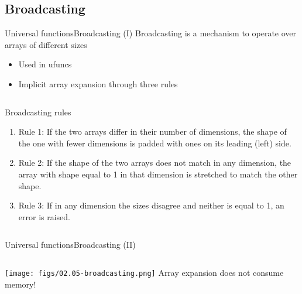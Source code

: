 \documentclass[10pt,compress]{beamer} %
\begin{document}
\subsection{Broadcasting}
\begin{frame}[fragile]{Universal functions}{Broadcasting (I)}
	Broadcasting is a mechanism to operate over arrays of different sizes
	\begin{itemize}
		\item Used in ufuncs
		\item Implicit array expansion through three rules
	\end{itemize}
	\vspace{-0.2cm} 
	\begin{columns}
		\begin{block}{\footnotesize{Broadcasting rules}}
		\vspace{-0.2cm} 
		\begin{enumerate}
		\item Rule 1: If the two arrays differ in their number of dimensions, the shape of the one with fewer dimensions is padded with ones on its leading (left) side.
		\item Rule 2: If the shape of the two arrays does not match in any dimension, the array with shape equal to 1 in that dimension is stretched to match the other shape.
		\item Rule 3: If in any dimension the sizes disagree and neither is equal to 1, an error is raised.
		\end{enumerate}
		\vspace{-0.2cm} 
		\end{block}
	\end{columns}
\end{frame}

\begin{frame}[fragile]{Universal functions}{Broadcasting (II)}
	\vspace{-0.2cm} 
	\begin{columns}
 	   \column{0.7\textwidth}
		\centering \texttt{[image: figs/02.05-broadcasting.png]}	
 	   \column{0.3\textwidth}
	   	Array expansion does not consume memory!
	\end{columns}
\end{frame}
\end{document}
